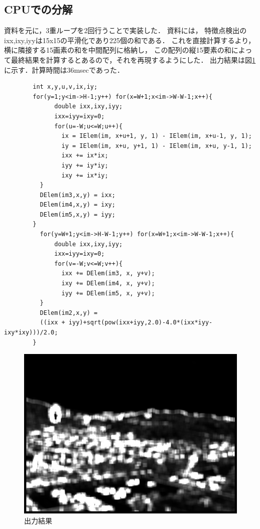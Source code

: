 \documentclass[11pt]{jarticle}
\begin{document}
\subsection{CPUでの分解}
資料を元に，3重ループを2回行うことで実装した．
資料には，
特徴点検出のixx,ixy,iyyは15x15の平滑化であり225個の和である．
これを直接計算するより，横に隣接する15画素の和を中間配列に格納し，
この配列の縦15要素の和によって最終結果を計算するとあるので，それを再現するようにした．
出力結果は図\ref{4-2.jpg}に示す．計算時間は36msecであった．
\begin{verbatim}
        int x,y,u,v,ix,iy;
        for(y=1;y<im->H-1;y++) for(x=W+1;x<im->W-W-1;x++){
              double ixx,ixy,iyy;
              ixx=iyy=ixy=0;
              for(u=-W;u<=W;u++){
                ix = IElem(im, x+u+1, y, 1) - IElem(im, x+u-1, y, 1);
                iy = IElem(im, x+u, y+1, 1) - IElem(im, x+u, y-1, 1);
                ixx += ix*ix;
                iyy += iy*iy;
                ixy += ix*iy;
          }
          DElem(im3,x,y) = ixx;
          DElem(im4,x,y) = ixy;
          DElem(im5,x,y) = iyy;
        }
          for(y=W+1;y<im->H-W-1;y++) for(x=W+1;x<im->W-W-1;x++){
              double ixx,ixy,iyy;
              ixx=iyy=ixy=0;
              for(v=-W;v<=W;v++){
                ixx += DElem(im3, x, y+v);
                ixy += DElem(im4, x, y+v);
                iyy += DElem(im5, x, y+v);
          }
          DElem(im2,x,y) = 
          ((ixx + iyy)+sqrt(pow(ixx+iyy,2.0)-4.0*(ixx*iyy-ixy*ixy)))/2.0;
        }
\end{verbatim}
\begin{figure}[t]
    \centering
    \includegraphics[scale=.5]{4-2.jpg}
    \caption{出力結果}
    \label{4-2.jpg}
\end{figure}
\end{document}
